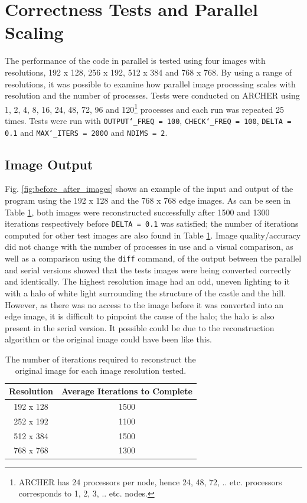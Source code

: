 \documentclass[11pt, a4paper]{article}
\begin{document}
	\section{Correctness Tests and Parallel Scaling}
		The performance of the code in parallel is tested using four images with resolutions, 192 x 128, 256 x 192, 512 x 384 and 768 x 768. By using a range of resolutions, it was possible to examine how parallel image processing scales with resolution and the number of processes. Tests were conducted on ARCHER using 1, 2, 4, 8, 16, 24, 48, 72, 96 and 120\footnote{ARCHER has 24 processors per node, hence 24, 48, 72, .. etc. processors corresponds to 1, 2, 3, .. etc. nodes.} processes and each run was repeated 25 times. Tests were run with \texttt{OUTPUT\char`_FREQ = 100}, \texttt{CHECK\char`_FREQ = 100}, \texttt{DELTA = 0.1} and \texttt{MAX\char`_ITERS = 2000} and \texttt{NDIMS = 2}.

		\subsection{Image Output}				
			Fig. \ref{fig:before_after_images} shows an example of the input and output of the program using the 192 x 128 and the 768 x 768 edge images. As can be seen in Table \ref{tab:iterations}, both images were reconstructed successfully after 1500 and 1300 iterations respectively before \texttt{DELTA = 0.1} was satisfied; the number of iterations computed for other test images are also found in Table \ref{tab:iterations}. Image quality/accuracy did not change with the number of processes in use and a visual comparison, as well as a comparison using the \texttt{diff} command, of the output between the parallel and serial versions showed that the tests images were being converted correctly and identically. The highest resolution image had an odd, uneven lighting to it with a halo of white light surrounding the structure of the castle and the hill. However, as there was no access to the image before it was converted into an edge image, it is difficult to pinpoint the cause of the halo; the halo is also present in the serial version. It possible could be due to the reconstruction algorithm or the original image could have been like this.
				
			\begin{table}[]
				\centering
				\begin{tabular}{|c|c|}
					\hline
					\textbf{Resolution} & \textbf{Average Iterations to Complete} \\ \hline
					192 x 128           & 1500                                    \\
					252 x 192           & 1100                                    \\
					512 x 384           & 1500                                    \\
					768 x 768           & 1300                                    \\ \hline
				\end{tabular}
				\caption{The number of iterations required to reconstruct the original image for each image resolution tested.}
				\label{tab:iterations}
			\end{table}	
				
\end{document}

